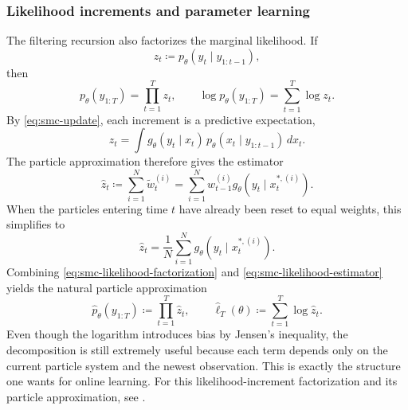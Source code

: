 \subsubsection{Likelihood increments and parameter learning}
\label{subsubsec:smc-likelihood}

The filtering recursion also factorizes the marginal likelihood.
If
\begin{equation}
  z_t \coloneqq p_\theta(y_t \mid y_{1:t-1}),
  \label{eq:smc-likelihood-increment}
\end{equation}
then
\begin{equation}
  p_\theta(y_{1:T})
  =
  \prod_{t=1}^T z_t,
  \qquad
  \log p_\theta(y_{1:T})
  =
  \sum_{t=1}^T \log z_t.
  \label{eq:smc-likelihood-factorization}
\end{equation}
By \eqref{eq:smc-update}, each increment is a predictive expectation,
\begin{equation}
  z_t
  =
  \int g_\theta(y_t \mid x_t)\,p_\theta(x_t \mid y_{1:t-1})\,dx_t.
  \label{eq:smc-likelihood-predictive}
\end{equation}
The particle approximation therefore gives the estimator
\begin{equation}
  \hat z_t
  \coloneqq
  \sum_{i=1}^N \tilde w_t^{(i)}
  =
  \sum_{i=1}^N w_{t-1}^{(i)} g_\theta(y_t \mid x_t^{*,(i)}).
  \label{eq:smc-likelihood-estimator}
\end{equation}
When the particles entering time $t$ have already been reset to equal weights, this simplifies to
\begin{equation}
  \hat z_t
  =
  \frac{1}{N}\sum_{i=1}^N g_\theta(y_t \mid x_t^{*,(i)}).
  \label{eq:smc-likelihood-estimator-equal-weights}
\end{equation}
Combining \eqref{eq:smc-likelihood-factorization} and \eqref{eq:smc-likelihood-estimator} yields the natural particle approximation
\begin{equation}
  \hat p_\theta(y_{1:T})
  \coloneqq
  \prod_{t=1}^T \hat z_t,
  \qquad
  \hat\ell_T(\theta)
  \coloneqq
  \sum_{t=1}^T \log \hat z_t.
  \label{eq:smc-loglik}
\end{equation}
Even though the logarithm introduces bias by Jensen's inequality, the decomposition is still extremely useful because each term depends only on the current particle system and the newest observation.
This is exactly the structure one wants for online learning.
For this likelihood-increment factorization and its particle approximation, see \citet[\S2.6.3]{liu_2002_monte_carlo}.

